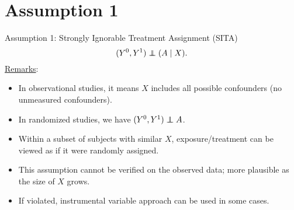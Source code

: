 \section{Assumption 1}
\begin{Regular}{Assumption 1: Strongly Ignorable Treatment Assignment (SITA)}
    \[ (Y^0,Y^1)\indep (A\mid X). \]
    \tcblower{}
    \underline{Remarks}:
    \begin{itemize}
        \item In observational studies, it means $X$ includes all possible
              confounders (no unmeasured confounders).
        \item In randomized studies, we have $ (Y^0,Y^1)\indep A $.
        \item Within a subset of subjects with similar $X$, exposure/treatment
              can be viewed as if it were randomly assigned.
        \item This assumption cannot be verified on the observed data;
              more plausible as the size of $X$ grows.
        \item If violated, instrumental variable approach can be used in
              some cases.
    \end{itemize}
\end{Regular}
